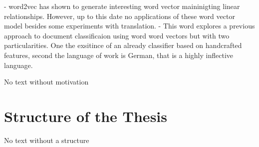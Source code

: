 - word2vec has shown to generate interesting word vector maininigting linear relationships. However, up to this date no applications of these word vector model besides some experiments with translation. 
- This word explores a previous approach to document classificaion using word word vectors but with two particularities. One the exsitince of an already classifier based on handcrafted features, second the language of work is German, that is a highly inflective language. 


No text without motivation


\section{Structure of the Thesis}
\label{sec:structure-thesis}
No text without a structure




 


